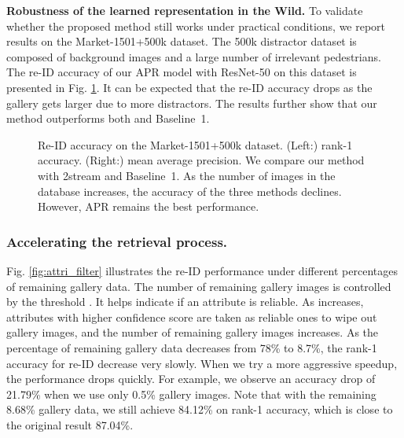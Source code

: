\documentclass[5p,times,twocolumn]{elsarticle}
\newcommand{\re}[1]{{\color{black}{#1}}}
\begin{document}
 \textbf{Robustness of the learned representation in the Wild.} To validate whether the proposed method still works under practical conditions, we report results on the Market-1501+500k dataset. The 500k distractor dataset is composed of background images and a large number of irrelevant pedestrians. The re-ID accuracy of our APR model with ResNet-50 on this dataset is presented in Fig. \ref{fig:distractor}. It can be expected that the re-ID accuracy drops as the gallery gets larger due to more distractors. The results further show that our method outperforms both \cite{zheng2017discriminatively} and Baseline~1. \re{However, the rank-1 accuracy of the proposed method drops faster than that of Baseline1. We think that the Baseline 1 may be able to retrieve the ground truths of easy queries, but APR could retrieve the ground truths of both the easy and hard queries. When increasing the number of images in the gallery, the easy query images can still be handled by both of the baseline and APR. However, the hard query sample can be harder to retrieve. Thus, the performance of APR drops faster.}
 

    \begin{figure} \centering 
        \caption{Re-ID accuracy on the Market-1501+500k dataset. (Left:) rank-1 accuracy. (Right:) mean average precision. We compare our method with 2stream \cite{zheng2017discriminatively} and Baseline~1. As the number of images in the database increases, the accuracy of the three methods declines. However, APR remains the best performance.} 
        \label{fig:distractor} 
    \end{figure}



\subsubsection{Accelerating the retrieval process.}  

Fig. \ref{fig:attri_filter} illustrates the re-ID performance under different percentages of remaining gallery data. The number of remaining gallery images is controlled by the threshold . It helps indicate if an attribute is reliable. As  increases, attributes with higher confidence score are taken as reliable ones to wipe out gallery images, and the number of remaining gallery images increases.
As the percentage of remaining gallery data decreases from 78\% to 8.7\%, the rank-1 accuracy for re-ID decrease very slowly. When we try a more aggressive speedup, the performance drops quickly. For example, we observe an accuracy drop of 21.79\% when we use only 0.5\% gallery images. Note that with the remaining 8.68\% gallery data, we still achieve 84.12\% on rank-1 accuracy, which is close to the original result 87.04\%.
\end{document}
